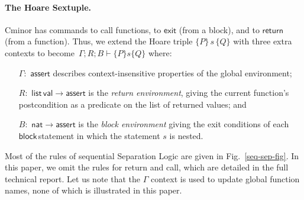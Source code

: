 \documentclass{llncs}
\newcommand{\cminor}{Cminor}
\newcommand{\tyface}[1]{\ensuremath{\mathsf{#1}}}
\newcommand{\Sblock}[1]{\tyface{block}\,#1}
\newcommand{\semax}[6]{#1;#2;#3\vdash \{#4\}#5\{#6\}}
\begin{document}
\paragraph{The Hoare Sextuple.}
\cminor{} has commands to
call functions, to \tyface{exit} (from a block), and to
\tyface{return} (from a function).  Thus, we extend the 
Hoare triple $\{P\}\,s\,\{Q\}$ with three extra contexts to become
$\,\semax{\Gamma}{R}{B}{P}{s}{Q}$
where:\vspace{-7 pt}
\begin{itemize}
\item[$\Gamma:$]$\tyface{assert}$ describes
context-insensitive properties of the global environment;
\item[$R:$]$\tyface{list}\,\tyface{val}\!\rightarrow\!\tyface{assert}$
is the \emph{return environment}, 
giving the current function's postcondition as a predicate
on the list of returned values; and 
\item[$B:$]$ \tyface{nat}\!\rightarrow\!\tyface{assert}$ is the
\emph{block environment} giving the exit conditions of each \Sblock statement
in which the statement $s$ is nested.
\end{itemize}

Most of the rules of sequential Separation Logic are given
in Fig.~\ref{seq-sep-fig}. In this paper, we omit the rules for return and call, 
which are detailed in the full technical report. Let us note that the $\Gamma$ context
is used to update global function names, none of which is illustrated in this paper.
\end{document}
